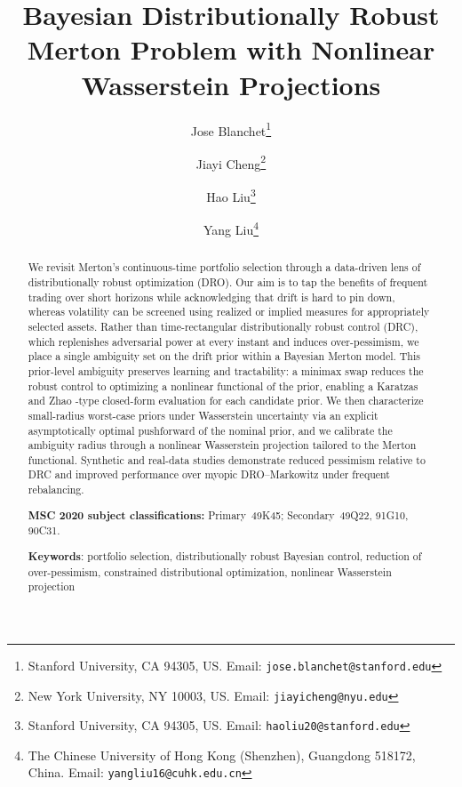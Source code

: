 \documentclass[11pt]{article}
\theoremstyle{definition}
\begin{document}
\title{Bayesian Distributionally Robust Merton Problem with Nonlinear Wasserstein Projections}
\author{ 
   Jose Blanchet\thanks{\scriptsize Stanford University, CA 94305, US. Email: \texttt{jose.blanchet@stanford.edu}}\and
   Jiayi Cheng\thanks{\scriptsize New York University, NY 10003, US. Email: \texttt{jiayicheng@nyu.edu}}
    \and Hao Liu\thanks{\scriptsize Stanford University, CA 94305, US. Email: \texttt{haoliu20@stanford.edu}} 
    \and 
    Yang Liu\thanks{\scriptsize The Chinese University of Hong Kong (Shenzhen), Guangdong 518172, China. Email: \texttt{yangliu16@cuhk.edu.cn}}
        }
\date{}%
\maketitle

\begin{abstract}
We revisit Merton's continuous-time portfolio selection through a data-driven {lens of distributionally robust optimization (DRO)}. Our aim is to tap the benefits of frequent trading over short horizons while acknowledging that drift is hard to pin down, whereas volatility can be screened using realized or implied measures for appropriately selected assets. Rather than time-rectangular distributionally robust control (DRC), which replenishes adversarial power at every instant and induces over-pessimism, we place a single ambiguity set on the drift prior within a Bayesian Merton model. This prior-level ambiguity preserves learning and tractability: a minimax swap reduces the robust control to optimizing a nonlinear functional of the prior, enabling a Karatzas and Zhao \cite{KZ98}-type closed-form evaluation for each candidate prior. We then characterize small-radius worst-case priors under Wasserstein uncertainty via an explicit asymptotically optimal pushforward of the nominal prior, and we calibrate the ambiguity radius through a nonlinear Wasserstein projection tailored to the Merton functional. Synthetic and real-data studies demonstrate reduced pessimism relative to DRC and improved performance over myopic DRO–Markowitz under frequent rebalancing.

\vspace{0.5em}
\noindent\textbf{MSC 2020 subject classifications:}
Primary~49K45; Secondary~49Q22, 91G10, 90C31.


\vspace{0.5em}
\noindent \textbf{Keywords}: portfolio selection, distributionally robust Bayesian control, reduction of over-pessimism, constrained distributional optimization, nonlinear Wasserstein projection 
\end{abstract}
\end{document}
